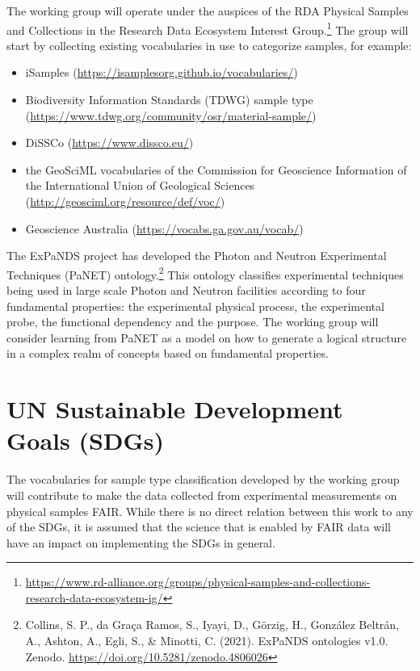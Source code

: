 \documentclass{scrartcl}
\begin{document}
The working group will operate under the auspices of the RDA Physical
Samples and Collections in the Research Data Ecosystem Interest
Group.\footnote{\url{https://www.rd-alliance.org/groups/physical-samples-and-collections-research-data-ecosystem-ig/}}
The group will start by collecting existing vocabularies in use to
categorize samples, for example:
\begin{itemize}
\item iSamples (\url{https://isamplesorg.github.io/vocabularies/})
\item Biodiversity Information Standards (TDWG) sample type
  (\url{https://www.tdwg.org/community/osr/material-sample/})
\item DiSSCo (\url{https://www.dissco.eu/})
\item the GeoSciML vocabularies of the Commission for Geoscience
  Information of the International Union of Geological Sciences
  (\url{http://geosciml.org/resource/def/voc/})
\item Geoscience Australia (\url{https://vocabs.ga.gov.au/vocab/})
\end{itemize}

The ExPaNDS project has developed the Photon and Neutron Experimental
Techniques (PaNET) ontology.\footnote{Collins, S. P., da Graça Ramos,
  S., Iyayi, D., Görzig, H., González Beltrán, A., Ashton, A., Egli,
  S., \& Minotti, C. (2021). ExPaNDS ontologies
  v1.0. Zenodo. \url{https://doi.org/10.5281/zenodo.4806026}}
This ontology classifies experimental techniques being used in large
scale Photon and Neutron facilities according to four fundamental
properties: the experimental physical process, the experimental probe,
the functional dependency and the purpose.  The working group will
consider learning from PaNET as a model on how to generate a logical
structure in a complex realm of concepts based on fundamental
properties.

\section{UN Sustainable Development Goals (SDGs)}

The vocabularies for sample type classification developed by the
working group will contribute to make the data collected from
experimental measurements on physical samples FAIR.  While there is no
direct relation between this work to any of the SDGs, it is assumed
that the science that is enabled by FAIR data will have an impact on
implementing the SDGs in general.
\end{document}
